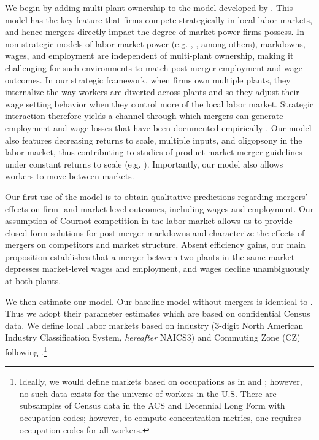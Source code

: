 \documentclass[12pt]{article}
\theoremstyle{prop}
\begin{document}
We begin by adding multi-plant ownership to the model developed by . 
This model has the key feature that firms compete strategically in local labor markets, and hence mergers directly impact the degree of market power firms possess. 
In non-strategic models of labor market power (e.g. \citet{card2018firms}, \citet{lamadon2022imperfect}, among others), markdowns, wages, and employment are independent of multi-plant ownership, making it challenging for such environments to match post-merger employment and wage outcomes. 
In our strategic framework, when firms own multiple plants, they internalize the way workers are diverted across plants and so they adjust their wage setting behavior when they control more of the local labor market. 
Strategic interaction therefore yields a channel through which mergers can generate employment and wage losses that have been documented empirically \citep{Arnold}.  
Our model also features decreasing returns to scale, multiple inputs, and oligopsony in the labor market, thus contributing to studies of product market merger guidelines under constant returns to scale (e.g. \citet{nocke2022concentration}). 
Importantly, our model also allows workers to move between markets.
 
Our first use of the model is to obtain qualitative predictions regarding mergers' effects on firm- and market-level outcomes, including wages and employment. 
Our assumption of Cournot competition in the labor market allows us to provide closed-form solutions for post-merger markdowns and characterize the effects of mergers on competitors and market structure.
Absent efficiency gains, our main proposition establishes that a merger between two plants in the same market depresses market-level wages and employment, and wages decline unambiguously at both plants. 

We then estimate our model. 
Our baseline model without mergers is identical to . 
Thus we adopt their parameter estimates which are based on confidential Census data. 
We define local labor markets based on industry (3-digit North American Industry Classification System, \textit{hereafter} NAICS3)  and Commuting Zone (CZ) following .\footnote{Ideally, we would define markets based on occupations as in \citet{azar2018concentration} and \citet{berger2023anatomy}; however, no such data exists for the universe of workers in the U.S. There are subsamples of Census data in the ACS and Decennial Long Form with occupation codes; however, to compute concentration metrics, one requires occupation codes for all workers. } 
\end{document}
